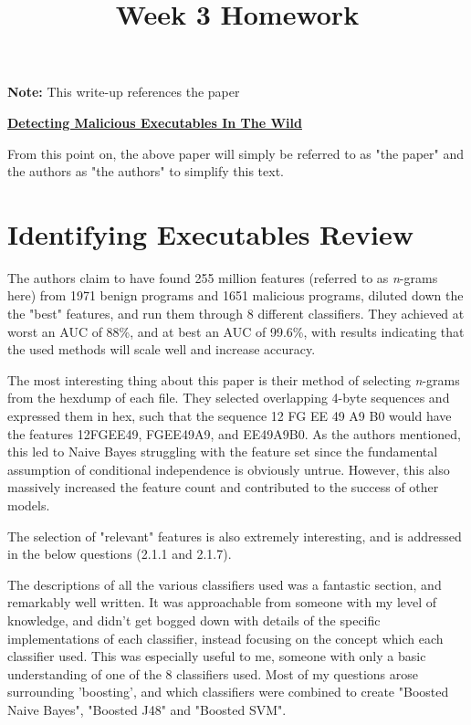 \documentclass{article}
\title{Week 3 Homework}
\begin{document}
 


\textbf{Note:} This write-up references the paper
\begin{center}
\textbf{\href{https://dl.packetstormsecurity.net/papers/IDS/hids/Learning-to-Detect-Malicious-Executables-in-the-Wild.pdf}{Detecting Malicious Executables In The Wild}}
\end{center}
From this point on, the above paper will simply be referred to as "the paper" and the authors as "the authors" to simplify this text.

\section{Identifying Executables Review}

The authors claim to have found 255 million features (referred to as \textit{n}-grams here) from 1971 benign programs and 1651 malicious programs, diluted down the the "best" features, and run them through 8 different classifiers. They achieved at worst an AUC of 88\%, and at best an AUC of 99.6\%, with results indicating that the used methods will scale well and increase accuracy. 

The most interesting thing about this paper is their method of selecting \textit{n}-grams from the hexdump of each file. They selected overlapping 4-byte sequences and expressed them in hex, such that the sequence 12 FG EE 49 A9 B0 would have the features 12FGEE49, FGEE49A9, and EE49A9B0. As the authors mentioned, this led to Naive Bayes struggling with the feature set since the fundamental assumption of conditional independence is obviously untrue. However, this also massively increased the feature count and contributed to the success of other models.

The selection of "relevant" features is also extremely interesting, and is addressed in the below questions (2.1.1 and 2.1.7). 

The descriptions of all the various classifiers used was a fantastic section, and remarkably well written. It was approachable from someone with my level of knowledge, and didn't get bogged down with details of the specific implementations of each classifier, instead focusing on the concept which each classifier used. This was especially useful to me, someone with only a basic understanding of one of the 8 classifiers used. Most of my questions arose surrounding 'boosting', and which classifiers were combined to create "Boosted Naive Bayes", "Boosted J48" and "Boosted SVM".
\end{document}
